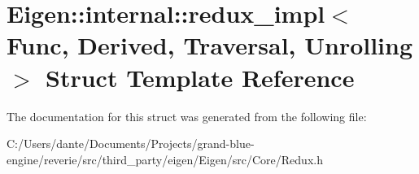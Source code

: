 \hypertarget{struct_eigen_1_1internal_1_1redux__impl}{}\section{Eigen\+::internal\+::redux\+\_\+impl$<$ Func, Derived, Traversal, Unrolling $>$ Struct Template Reference}
\label{struct_eigen_1_1internal_1_1redux__impl}


The documentation for this struct was generated from the following file\+:\begin{DoxyCompactItemize}
\item 
C\+:/\+Users/dante/\+Documents/\+Projects/grand-\/blue-\/engine/reverie/src/third\+\_\+party/eigen/\+Eigen/src/\+Core/Redux.\+h\end{DoxyCompactItemize}
